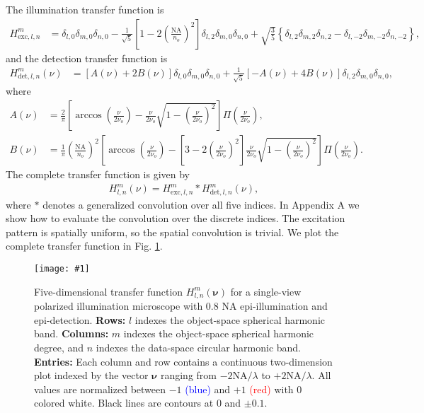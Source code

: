 \documentclass[11pt]{article}
\providecommand{\bs}[1]{\boldsymbol{#1}}
\providecommand{\fig}[4]{
\begin{figure}[h]
 \captionsetup{width=1.0\linewidth}
 \centering
 \texttt{[image: \#1]}
 \caption{#3}
 \label{fig:#4}
\end{figure}
}
\begin{document}
The illumination transfer function is
\begin{align}
  H^m_{\text{exc},l,n} &= \delta_{l,0}\delta_{m,0}\delta_{n,0} - \frac{1}{\sqrt{5}}\left[1 - 2\left(\frac{\text{NA}}{n_o}\right)^2\right]\delta_{l,2}\delta_{m,0}\delta_{n,0} + \sqrt{\frac{3}{5}}\left\{\delta_{l,2}\delta_{m,2}\delta_{n,2} - \delta_{l,-2}\delta_{m,-2}\delta_{n,-2}\right\}, 
\end{align}
and the detection transfer function is 
\begin{align}
  H^m_{\text{det},l,n}(\nu) &= [A(\nu) + 2B(\nu)]\delta_{l,0}\delta_{m,0}\delta_{n,0} + \frac{1}{\sqrt{5}}\left[- A(\nu) + 4B(\nu)\right]\delta_{l,2}\delta_{m,0}\delta_{n,0},
\end{align}
where
\begin{align}
  A(\nu) &= \frac{2}{\pi}\left[\arccos\left(\frac{\nu}{2\nu_o}\right) - \frac{\nu}{2\nu_o}\sqrt{1 - \left(\frac{\nu}{2\nu_o}\right)^2}\right]\Pi\left(\frac{\nu}{2\nu_o}\right),\\
  B(\nu) &= \frac{1}{\pi}\left(\frac{\text{NA}}{n_o}\right)^2\left[\arccos\left(\frac{\nu}{2\nu_o}\right) - \left[3 - 2\left(\frac{\nu}{2\nu_o}\right)^2\right]\frac{\nu}{2\nu_o} \sqrt{1 - \left(\frac{\nu}{2\nu_o}\right)^2}\right]\Pi\left(\frac{\nu}{2\nu_o}\right).                 
\end{align}
The complete transfer function is given by
\begin{align}
  H_{l,n}^m(\nu) = H^m_{\text{exc},l,n} * H^m_{\text{det},l,n}(\nu),
\end{align}
where $*$ denotes a generalized convolution over all five indices. In Appendix A
we show how to evaluate the convolution over the discrete indices. The
excitation pattern is spatially uniform, so the spatial convolution is trivial.
We plot the complete transfer function in Fig. \ref{fig:illtran}.
\fig{../calculations/out/Hill.pdf}{1.0}{Five-dimensional transfer function
  $H_{l,n}^m(\bs{\nu})$ for a single-view polarized illumination microscope with
  0.8 NA epi-illumination and epi-detection. \textbf{Rows:} $l$ indexes the
  object-space spherical harmonic band. \textbf{Columns:} $m$ indexes the
  object-space spherical harmonic degree, and $n$ indexes the data-space
  circular harmonic band. \textbf{Entries:} Each column and row contains a
  continuous two-dimension plot indexed by the vector $\bs{\nu}$ ranging from
  $-2\text{NA}/\lambda$ to $+2\text{NA}/\lambda$. All values are normalized
  between $-1$ \textcolor{blue}{(blue)} and $+1$ \textcolor{red}{(red)} with $0$
  colored white. Black lines are contours at 0 and $\pm 0.1$.}{illtran}
\end{document}
